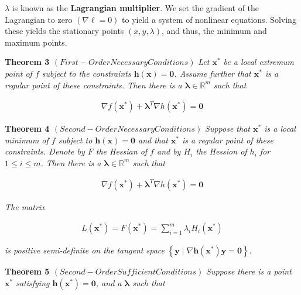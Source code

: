 \documentclass[11pt]{article}
\begin{document}
\(\lambda\) is known as the \textbf{Lagrangian multiplier}. We set the gradient of the Lagrangian to zero \(\left(\nabla \ell = 0\right)\) to yield a system of nonlinear equations. Solving these yields the stationary points \(\left(x,y,\lambda\right)\), and thus, the minimum and maximum points.

\textbf{Theorem 3 \(\left(First-Order Necessary Conditions\right)\)} \emph{Let \(\boldsymbol{x}^{*}\) be a local extremum point of \(f\) subject to the constraints \(\boldsymbol{h}\left(\boldsymbol{x}\right) = \boldsymbol{0}\). Assume further that \(\boldsymbol{x}^{*}\) is a regular point of these constraints. Then there is a \(\boldsymbol{\lambda} \in \mathbb{R}^{m}\) such that}

\begin{align*}
    \nabla f\left(\boldsymbol{x}^{*}\right) + \boldsymbol{\lambda}^{T}\nabla h\left(\boldsymbol{x}^{*}\right) = \boldsymbol{0}
\end{align*}

\textbf{Theorem 4 \(\left(Second-Order Necessary Conditions\right)\)} \emph{Suppose that \(\boldsymbol{x}^{*}\) is a local minimum of \(f\) subject to \(\boldsymbol{h}\left(\boldsymbol{x}\right) = \boldsymbol{0}\) and that \(\boldsymbol{x}^{*}\) is a regular point of these constraints. Denote by \(F\) the Hessian of \(f\) and by \(H_{i}\) the Hession of \(h_{i}\) for \(1 \leq i \leq m\). Then there is a \(\boldsymbol{\lambda} \in \mathbb{R}^{m}\) such that}

\begin{align*}
    \nabla f\left(\boldsymbol{x}^{*}\right) + \boldsymbol{\lambda}^{T}\nabla h\left(\boldsymbol{x}^{*}\right) = \boldsymbol{0}
\end{align*}

\emph{The matrix}

\begin{align}
    L\left(\boldsymbol{x}^{*}\right) = F\left(\boldsymbol{x}^{*}\right) = \sum_{i = 1}^{m}\lambda_{i}H_{i}\left(\boldsymbol{x}^{*}\right)
\end{align}

\emph{is positive semi-definite on the tangent space} \(\left\lbrace \boldsymbol{y} \mid \nabla\boldsymbol{h}\left(\boldsymbol{x}^{*}\right)\boldsymbol{y} = \boldsymbol{0}\right\rbrace\).

\textbf{Theorem 5 \(\left(Second-Order Sufficient Conditions\right)\)} \emph{Suppose there is a point \(\boldsymbol{x}^{*}\) satisfying \(\boldsymbol{h}\left(\boldsymbol{x}^{*}\right) = \boldsymbol{0}\), and a \(\boldsymbol{\lambda}\) such that}
\end{document}
